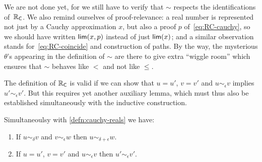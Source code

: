 We are not done yet, for we still have to verify that $\sim$ respects the identifications
of~$\mathbb{R}_\mathsf{C}$. We also remind ourselves of proof-relevance: a real number is represented not
just by a Cauchy approximation $x$, but also a proof $p$ of~\eqref{eq:RC-cauchy}, so we
should have written $\mathsf{lim}(x,p)$ instead of just $\mathsf{lim}(x)$; and a similar observation
stands for~\eqref{eq:RC-coincide} and construction of paths. By the way, the mysterious
$\theta$'s appearing in the definition of $\sim$ are there to give extra ``wiggle room''
which ensures that $\sim$ behaves like $<$ and not like $\leq$.

The definition of $\mathbb{R}_\mathsf{C}$ is valid if we can show that $u = u'$, $v = v'$ and $u
\sim_\epsilon v$ implies $u' \sim_\epsilon v'$. But this requires yet another auxiliary
lemma, which must thus also be established simultaneously with the inductive construction.

\begin{lem}\label{lem:RC-well-defined}
  Simultaneoulsy with \autoref{defn:cauchy-reals} we have:
  \begin{enumerate}
  \item If $u \sim_\delta v$ and $v \sim_\epsilon w$ then $u \sim_{\delta + \epsilon} w$.
  \item If $u = u'$, $v = v'$ and $u \sim_\epsilon v$ then $u' \sim_\epsilon v'$.
  \end{enumerate}
\end{lem}


